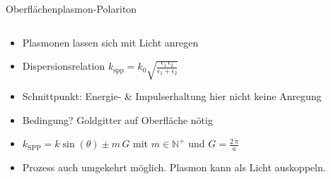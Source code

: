 \begin{frame}{Oberflächenplasmon-Polariton}
    \begin{columns}
        \begin{column}{0.5\textwidth}
            \begin{itemize}
                \item <1-> Plasmonen lassen sich mit Licht anregen
                \bigskip
                \item <2-> Dispersionsrelation $k_\text{spp} = k_0 \sqrt{\frac{\epsilon_1 \,\epsilon_2}{\epsilon_1 + \epsilon_2}}$
                \item <4-> Schnittpunkt: Energie- \& Impulserhaltung \rightarrow hier nicht \rightarrow keine Anregung
                \bigskip 
                \item <5-> Bedingung? \rightarrow Goldgitter auf Oberfläche nötig
                \item <7-> $k_\text{SPP} = k \sin(\theta) \pm m \, G $ mit $m \in \mathbb{N}^+$ und $G = \frac{2 \, \pi}{a}$
               \bigskip 
                \item <8-> Prozess auch umgekehrt möglich. Plasmon kann als Licht auskoppeln.
            \end{itemize}
        \end{column}
        \begin{column}{0.5\textwidth}
            \centering
        \end{column}
    \end{columns}
\end{frame}

